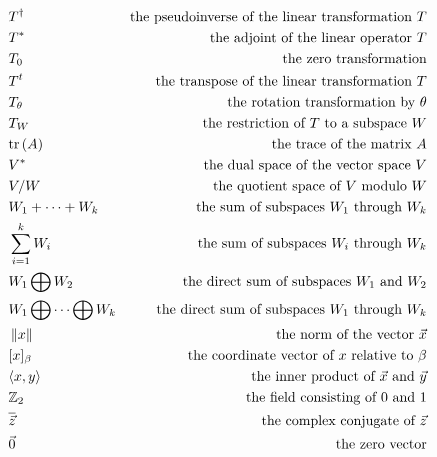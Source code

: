 \begin{align*}
	 & T^\dag                            & \text{the pseudoinverse of the linear transformation $T$} \\
	 & T^*                               & \text{the adjoint of the linear operator $T$}             \\
	 & T_0                               & \text{the zero transformation}                            \\
	 & T^t                               & \text{the transpose of the linear transformation $T$}     \\
	 & T_\theta                          & \text{the rotation transformation by $\theta$}            \\
	 & T_W                               & \text{the restriction of $T$ to a subspace $W$}           \\
	 & \text{tr}\left(A\right)                           & \text{the trace of the matrix $A$}                        \\
	 & V^*                               & \text{the dual space of the vector space $V$}             \\
	 & V/W                               & \text{the quotient space of $V$ modulo $W$}               \\
	 & W_1 + \dots + W_k                 & \text{the sum of subspaces $W_1$ through $W_k$}           \\
	 & \sum_{i=1}^k W_i                  & \text{the sum of subspaces $W_i$ through $W_k$}           \\
	 & W_1 \bigoplus W_2                 & \text{the direct sum of subspaces $W_1$ and $W_2$}        \\
	 & W_1 \bigoplus \dots \bigoplus W_k & \text{the direct sum of subspaces $W_1$ through $W_k$}    \\
	 & \left\lVert x\right\rVert                          & \text{the norm of the vector $\vec{x}$}                   \\
	 & [x]_\beta                         & \text{the coordinate vector of $x$ relative to $\beta$}   \\
	 & \langle x, y \rangle              & \text{the inner product of $\vec{x}$ and $\vec{y}$}       \\
	 & \mathbb{Z}_2                              & \text{the field consisting of $0$ and $1$}                \\
	 & \overline{\vec{z}}                & \text{the complex conjugate of $\vec{z}$}                 \\
	 & \vec{0}                           & \text{the zero vector}                                    \\
\end{align*}
